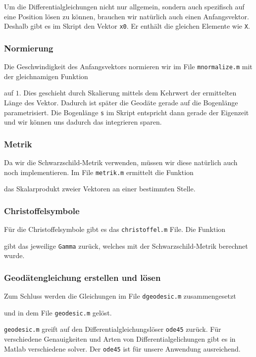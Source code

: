 \begin{refsection}
    Um die Differentialgleichungen nicht nur allgemein, sondern auch spezifisch auf eine Position lösen zu können, brauchen wir natürlich auch einen Anfangsvektor. Deshalb gibt es im Skript den Vektor \texttt{x0}. Er enthält die gleichen Elemente wie \texttt{X}.
    
    \subsubsection{Normierung}
    Die Geschwindigkeit des Anfangsvektors normieren wir im File \texttt{mnormalize.m} mit der gleichnamigen Funktion 
     
    auf $1$. Dies geschieht durch Skalierung mittels dem Kehrwert der ermittelten Länge des Vektor. Dadurch ist später die Geodäte gerade auf die Bogenlänge parametrisiert. Die Bogenlänge \texttt{s} im Skript entspricht dann gerade der Eigenzeit und wir können uns dadurch das integrieren sparen.
    
    \subsubsection{Metrik}
    Da wir die Schwarzschild-Metrik verwenden, müssen wir diese natürlich auch noch implementieren.
    Im File \texttt{metrik.m} ermittelt die Funktion
     
    das Skalarprodukt zweier Vektoren an einer bestimmten Stelle.
    \subsubsection{Christoffelsymbole}
    Für die Christoffelsymbole gibt es das \texttt{christoffel.m} File. Die Funktion 
     
    gibt das jeweilige \texttt{Gamma} zurück, welches mit der Schwarzschild-Metrik berechnet wurde.
    \subsubsection{Geodätengleichung erstellen und lösen}
    Zum Schluss werden die Gleichungen im File \texttt{dgeodesic.m} zusammengesetzt
     
    und in dem File \texttt{geodesic.m} gelöst. 
     
    \texttt{geodesic.m} greift auf den Differentialgleichungslöser \texttt{ode45} zurück. Für verschiedene Genauigkeiten und Arten von Differentialgelichungen gibt es in Matlab verschiedene solver. Der \texttt{ode45} ist für unsere Anwendung ausreichend.
    

\end{refsection}
